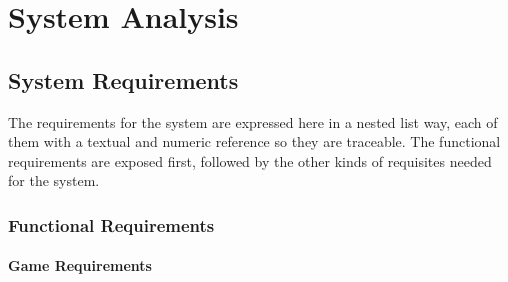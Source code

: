 \section{System Analysis}


\subsection{System Requirements}

The requirements for the system are expressed here in a nested list way, each of
them with a textual and numeric reference so they are traceable. The functional
requirements are exposed first, followed by the other kinds of requisites needed
for the system.


\subsubsection{Functional Requirements}

\paragraph{Game Requirements}


